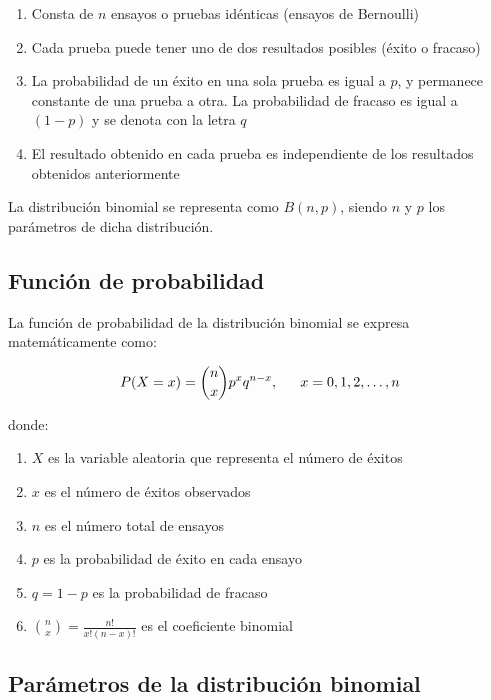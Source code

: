 \documentclass[
  spanish,
  letterpaper,
]{book}
\begin{document}
\begin{enumerate}
\def\labelenumi{\arabic{enumi}.}
\item
  Consta de \(n\) ensayos o pruebas idénticas (ensayos de Bernoulli)
\item
  Cada prueba puede tener uno de dos resultados posibles (éxito o
  fracaso)
\item
  La probabilidad de un éxito en una sola prueba es igual a \(p\), y
  permanece constante de una prueba a otra. La probabilidad de fracaso
  es igual a \((1-p)\) y se denota con la letra \(q\)
\item
  El resultado obtenido en cada prueba es independiente de los
  resultados obtenidos anteriormente
\end{enumerate}

La distribución binomial se representa como \(B(n,p)\), siendo \(n\) y
\(p\) los parámetros de dicha distribución.

\subsection{Función de probabilidad}\label{funciuxf3n-de-probabilidad}

La función de probabilidad de la distribución binomial se expresa
matemáticamente como:

\[\LARGE P(X = x) = \binom{n}{x} p^x q^{n-x}, \quad x = 0,1,2,\ldots,n\]

donde:

\begin{enumerate}
\def\labelenumi{\arabic{enumi}.}
\item
  \(X\) es la variable aleatoria que representa el número de éxitos
\item
  \(x\) es el número de éxitos observados
\item
  \(n\) es el número total de ensayos
\item
  \(p\) es la probabilidad de éxito en cada ensayo
\item
  \(q = 1-p\) es la probabilidad de fracaso
\item
  \(\binom{n}{x} = \frac{n!}{x!(n-x)!}\) es el coeficiente binomial
\end{enumerate}

\subsection{Parámetros de la distribución
binomial}\label{paruxe1metros-de-la-distribuciuxf3n-binomial}
\end{document}
